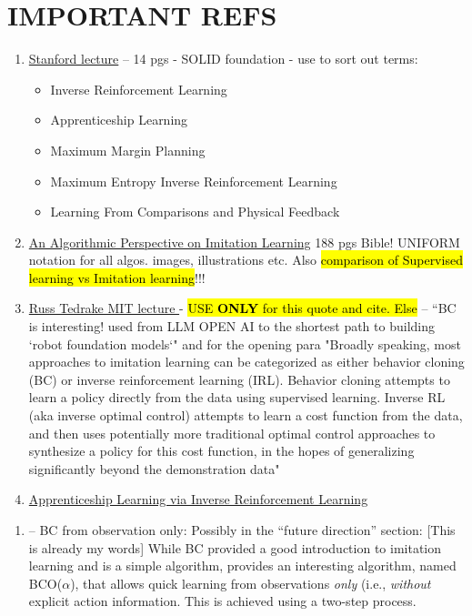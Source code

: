 \documentclass{article}
\newcommand{\hlc}[2][blue!10]{{\colorlet{foo}{#1} \sethlcolor{foo}\hl{#2}}}
\begin{document}
	\section{IMPORTANT REFS}
	\begin{enumerate}
		\item \href{https://web.stanford.edu/class/cs237b/pdfs/lecture/cs237b_lecture_12.pdf}{Stanford lecture} -- 14 pgs - SOLID foundation - use to sort out terms:
		\begin{itemize}
			\item Inverse Reinforcement Learning  
			\item Apprenticeship Learning 
			\item Maximum Margin Planning
			\item Maximum Entropy Inverse Reinforcement Learning
			\item Learning From Comparisons and Physical Feedback
		\end{itemize}
		\item \cite{Osa-2018} \href{https://arxiv.org/pdf/1811.06711}{An Algorithmic Perspective on Imitation Learning} 188 pgs Bible! UNIFORM notation for all algos. images, illustrations etc. Also \hlc{comparison of Supervised learning vs Imitation learning}!!!
		\item \href{https://underactuated.mit.edu/imitation.html#:~:text=Broadly%20speaking%2C%20most%20approaches%20to,the%20data%20using%20supervised%20learning.}{Russ Tedrake MIT lecture \citep{TedrakeLecture2023}} - \hlc{USE \textbf{ONLY} for this quote and cite. Else } -- ``BC is interesting! used from LLM OPEN AI to the shortest path to building `robot foundation models`"  and for the opening para "Broadly speaking, most approaches to imitation learning can be categorized as either behavior cloning (BC) or inverse reinforcement learning (IRL). Behavior cloning attempts to learn a policy directly from the data using supervised learning. Inverse RL (aka inverse optimal control) attempts to learn a cost function from the data, and then uses potentially more traditional optimal control approaches to synthesize a policy for this cost function, in the hopes of generalizing significantly beyond the demonstration data"
		\item \href{https://ai.stanford.edu/~ang/papers/icml04-apprentice.pdf}{Apprenticeship Learning via Inverse Reinforcement Learning}
	\end{enumerate}
	\begin{enumerate}
		\item \cite{torabi2018BCO} -- BC from observation only: Possibly in the ``future direction'' section: [This is already my words] While BC provided a good introduction to imitation learning and is a simple algorithm, \cite{torabi2018BCO} provides an interesting algorithm, named BCO($\alpha$), that allows quick learning from observations \textit{only} (i.e., \textit{without} explicit action information. This is achieved using a two-step process.
	\end{enumerate}
	
\end{document}
